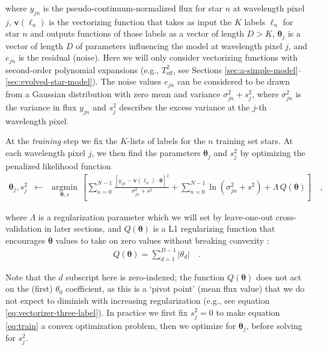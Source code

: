 \documentclass[preprint]{aastex}
\newcommand{\teff}{T_{\mathrm{eff}}}
\newcommand{\Dvector}[1]{\boldsymbol{#1}}
\newcommand{\vectheta}{\Dvector{\theta}}
\newcommand{\vecv}{\Dvector{v}}
\newcommand{\argmin}[1]{\underset{#1}{\operatorname{argmin}}\,}
\begin{document}
\noindent{}where $y_{jn}$ is the pseudo-continuum-normalized flux for star $n$ at wavelength pixel
$j$, $\vecv(\ell_n)$ is the vectorizing function that takes as input the $K$ labels
$\ell_n$ for star $n$ and outputs functions of those labels as a vector of length
$D>K$, $\vectheta_j$ is a vector of length $D$ of parameters influencing the model at
wavelength pixel $j$, and $e_{jn}$ is the residual (noise).  Here we will only consider
vectorizing functions with second-order polynomial expansions (e.g., $\teff^2$, see Sections 
\ref{sec:a-simple-model}--\ref{sec:evolved-star-model}).  The noise values $e_{jn}$ can 
be considered to be drawn from a Gaussian distribution with zero mean and variance 
$\sigma_{jn}^2 + s_j^2$, where $\sigma_{jn}^2$ is the variance in flux $y_{jn}$ and 
$s_j^2$ describes the excess variance at the $j$-th wavelength pixel. 


At the \emph{training} step we fix the $K$-lists of labels for the $n$ training set stars.
At each wavelength pixel $j$, we then find the parameters $\vectheta_j$ and $s_j^2$
by optimizing the penalized likelihood function
\begin{eqnarray}\label{eq:train}
\vectheta_j,s^2_j &\leftarrow& \argmin{\vectheta,s}\left[
    \sum_{n=0}^{N-1} \frac{[y_{jn}-\vecv(\ell_n)\cdot\vectheta]^2}{\sigma^2_{jn}+s^2}
    + \sum_{n=0}^{N-1} \ln(\sigma^2_{jn}+s^2) + \Lambda{}\,Q(\vectheta)
    \right]
  \quad ,
\end{eqnarray}

\noindent{}where $\Lambda$ is a regularization parameter which we will set by leave-one-out 
cross-validation in later sections, and $Q(\vectheta)$ is a L1 regularizing function 
\citep[e.g., see \emph{LASSO} in][and related literature]{Tibshirani_1996} that encourages 
$\vectheta$ values to take on zero values without breaking convexity \citep{Casey_2016b}:
\begin{eqnarray}\label{eq:regularization-function}
	Q(\vectheta) = \sum_{d=1}^{D-1} |{\theta_d}| \quad .
\end{eqnarray}

Note that the $d$ subscript here is zero-indexed; the function $Q(\vectheta)$ does not act
on the (first) $\theta_0$ coefficient, as this is a `pivot point' (mean flux value) that 
we do not expect to diminish with increasing regularization (e.g., see equation 
\ref{eq:vectorizer-three-label}).  In practice we first fix $s_j^2 = 0$ to make equation
\ref{eq:train} a convex optimization problem, then we optimize for $\vectheta_j$, before 
solving for $s_j^2$.  
\end{document}
